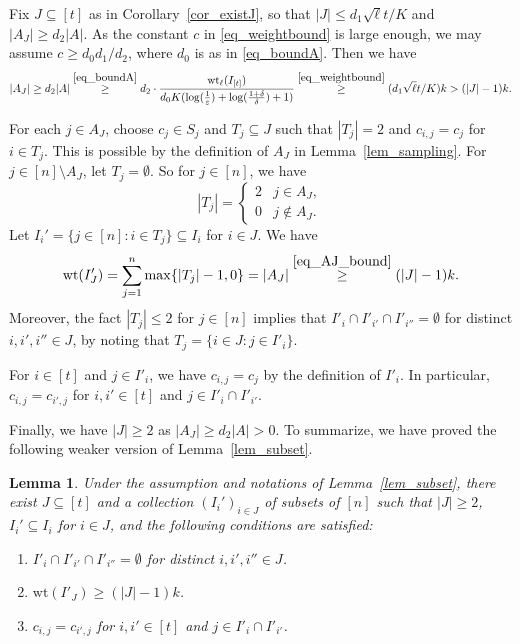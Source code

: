 \documentclass[11pt]{article}
\newtheorem{lemma}[theorem]{Lemma}
\renewcommand{\epsilon}{\varepsilon}
\begin{document}
Fix $J\subseteq [t]$ as in Corollary~\ref{cor_existJ}, so that $|J|\leq d_1\sqrt{\ell}t/K$ and $|A_J|\geq d_2 |A|$.
As the constant $c$ in \eqref{eq_weightbound} is large enough, we may assume $c\geq d_0 d_1/d_2$, where $d_0$ is as in \eqref{eq_boundA}.
Then we have
\begin{equation}\label{eq_AJ_bound}
|A_J|\geq d_2|A|\stackrel{\eqref{eq_boundA}}{\geq} d_2  \cdot \frac{\mathrm{wt}_\ell(I_{[t]})}{d_0 K (\log(\frac{1}{\epsilon})+\log( \frac{1+\delta}{\delta })+1)}  \stackrel{\eqref{eq_weightbound}}{\geq} (d_1\sqrt{\ell}t/K)k > (|J|-1)k.
\end{equation}

For each $j\in A_J$, choose $c_j\in S_j$ and $T_j\subseteq J$ such that $|T_j|=2$ and $c_{i,j}=c_j$ for $i\in T_j$. This is possible by the definition of $A_J$ in Lemma~\ref{lem_sampling}. For $j\in [n]\setminus A_J$, let $T_j=\emptyset$.  So for $j\in [n]$, we have
\[
|T_j|=\begin{cases} 2 & j\in A_J,\\
0 & j\not\in A_J.
\end{cases}
\]
Let $I_i'=\{j\in [n]: i\in T_j\}\subseteq I_i$ for $i\in J$. We have
\[
\mathrm{wt}(I_J')=\sum_{j=1}^n \max\{|T_j|-1, 0\}=|A_J|\stackrel{\eqref{eq_AJ_bound}}{\geq} (|J|-1)k.
\]
Moreover, the fact $|T_j|\leq 2$ for $j\in [n]$ implies that $I'_{i}\cap I'_{i'}\cap I'_{i''}=\emptyset$ for distinct  $i,i',i''\in J$, by noting that $T_j=\{i\in J: j\in I'_i\}$.

For $i\in [t]$ and $j\in I'_i$, we have $c_{i,j}=c_j$ by the definition of $I'_i$. In particular, $c_{i,j}=c_{i',j}$ for $i,i'\in [t]$ and $j\in I'_i\cap I'_{i'}$.

Finally, we have $|J|\geq 2$ as $|A_J|\geq d_2 |A|>0$. To summarize, we have proved the following weaker version of Lemma~\ref{lem_subset}.
\begin{lemma}\label{lem_weak_subset}
Under the assumption and notations of Lemma~\ref{lem_subset}, there exist $J\subseteq [t]$ and a collection $(I_i')_{i\in J}$ of subsets of $[n]$ such that $|J|\geq 2$, $I_i'\subseteq I_i$ for $i\in J$, and the following conditions are satisfied:
\begin{enumerate}[(1)]
\item $I'_{i}\cap I'_{i'}\cap I'_{i''}=\emptyset$ for distinct  $i,i',i''\in J$.
\item $\mathrm{wt}(I'_J)\geq (|J|-1)k$.
\item $c_{i,j}=c_{i',j}$ for $i,i'\in [t]$ and $j\in I'_i\cap I'_{i'}$.
\end{enumerate}
\end{lemma}
\end{document}
